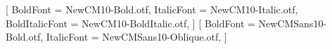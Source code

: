 %
%

\usepackage{amsmath}
\usepackage{amsthm}
\usepackage{mathtools}
\usepackage{graphicx}
\usepackage{needspace}
\usepackage{enumitem}
\usepackage{xcolor}
\usepackage{fancyhdr}
\usepackage{titlesec}
\usepackage[most]{tcolorbox}

\usepackage[a4paper, left=32mm, right=28mm, top=22mm, bottom=24mm,
            headheight=15pt, headsep=8mm, footskip=12mm]{geometry}

\usepackage{fontspec}
\usepackage{unicode-math}
\setmainfont{NewCM10-Regular.otf}[
  BoldFont       = NewCM10-Bold.otf,
  ItalicFont     = NewCM10-Italic.otf,
  BoldItalicFont = NewCM10-BoldItalic.otf,
]
\setsansfont{NewCMSans10-Regular.otf}[
  BoldFont       = NewCMSans10-Bold.otf,
  ItalicFont     = NewCMSans10-Oblique.otf,
]

